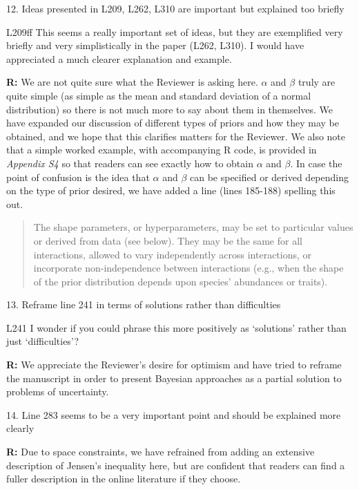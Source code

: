 \documentclass[12pt]{letter}
\newenvironment{refquote}{\bigskip \begin{it}}{\end{it}\smallskip}
\begin{document}
	12. Ideas presented in L209, L262, L310 are important but explained too briefly


		\begin{refquote}
		L209ff This seems a really important set of ideas, but they are exemplified very briefly and very simplistically in the paper (L262, L310). I would have appreciated a much clearer explanation and example.
		\end{refquote}


		\textbf{R:} We are not quite sure what the Reviewer is asking here. $\alpha$ and $\beta$ truly are quite simple (as simple as the mean and standard deviation of a normal distribution) so there is not much more to say about them in themselves. We have expanded our discussion of different types of priors and how they may be obtained, and we hope that this clarifies matters for the Reviewer. We also note that a simple worked example, with accompanying R code, is provided in \emph{Appendix S4} so that readers can see exactly how to obtain $\alpha$ and $\beta$. In case the point of confusion is the idea that $\alpha$ and $\beta$ can be specified or derived depending on the type of prior desired, we have added a line (lines 185-188) spelling this out.


		\begin{quotation}
			The shape parameters, or hyperparameters, may be set to particular values or derived from data (see below). They may be the same for all interactions, allowed to vary independently across interactions, or incorporate non-independence between interactions (e.g., when the shape of the prior distribution depends upon species' abundances or traits).
			\end{quotation}


	13. Reframe line 241 in terms of solutions rather than difficulties


		\begin{refquote}
		L241 I wonder if you could phrase this more positively as `solutions' rather than just `difficulties'?
		\end{refquote}


		\textbf{R:} We appreciate the Reviewer's desire for optimism and have tried to reframe the manuscript in order to present Bayesian approaches as a partial solution to problems of uncertainty.


	14. Line 283 seems to be a very important point and should be explained more clearly


		\textbf{R:} Due to space constraints, we have refrained from adding an extensive description of Jensen's inequality here, but are confident that readers can find a fuller description in the online literature if they choose.
\end{document}
